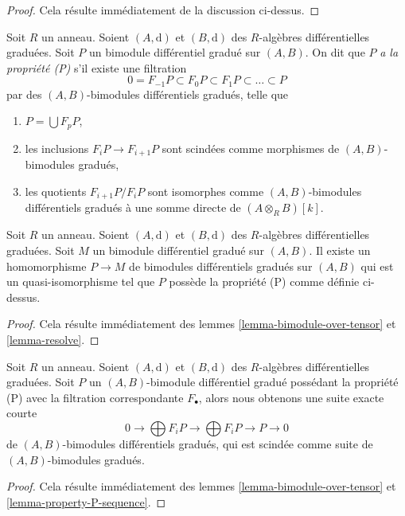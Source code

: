 \begin{proof}
Cela résulte immédiatement de la discussion ci-dessus.
\end{proof}

\noindent
Soit $R$ un anneau. Soient $(A, \text{d})$ et $(B, \text{d})$ des
$R$-algèbres différentielles
graduées. Soit $P$ un bimodule différentiel gradué sur $(A, B)$. On dit
que $P$ {\it a la propriété (P)} s'il existe une filtration
$$
0 = F_{-1}P \subset F_0P \subset F_1P \subset \ldots \subset P
$$
par des $(A, B)$-bimodules différentiels gradués, telle que
\begin{enumerate}
\item $P = \bigcup F_pP$,
\item les inclusions $F_iP \to F_{i + 1}P$ sont scindées comme morphismes
de $(A, B)$-bimodules gradués,
\item les quotients $F_{i + 1}P/F_iP$ sont isomorphes comme $(A,
B)$-bimodules différentiels gradués à une somme directe de $(A \otimes_R B)[k]$.
\end{enumerate}

\begin{lemma}
\label{lemma-bimodule-resolve}
Soit $R$ un anneau. Soient $(A, \text{d})$ et $(B, \text{d})$ des
$R$-algèbres différentielles graduées. Soit $M$ un bimodule différentiel
gradué sur $(A, B)$. Il existe un homomorphisme $P \to M$ de
bimodules différentiels gradués sur $(A, B)$ qui est un quasi-isomorphisme tel que
$P$ possède la propriété (P) comme définie ci-dessus.
\end{lemma}

\begin{proof}
Cela résulte immédiatement des lemmes
\ref{lemma-bimodule-over-tensor} et \ref{lemma-resolve}.
\end{proof}

\begin{lemma}
\label{lemma-bimodule-property-P-sequence}
Soit $R$ un anneau. Soient $(A, \text{d})$ et $(B, \text{d})$ des
$R$-algèbres différentielles graduées. Soit $P$ un
$(A, B)$-bimodule différentiel gradué possédant la propriété (P)
avec la filtration correspondante $F_\bullet$, alors nous obtenons une
suite exacte courte
$$
0 \to
\bigoplus\nolimits F_iP \to
\bigoplus\nolimits F_iP \to P \to 0
$$
de $(A, B)$-bimodules différentiels gradués, qui est scindée comme suite
de $(A, B)$-bimodules gradués.
\end{lemma}

\begin{proof}
Cela résulte immédiatement des lemmes
\ref{lemma-bimodule-over-tensor} et \ref{lemma-property-P-sequence}.
\end{proof}















